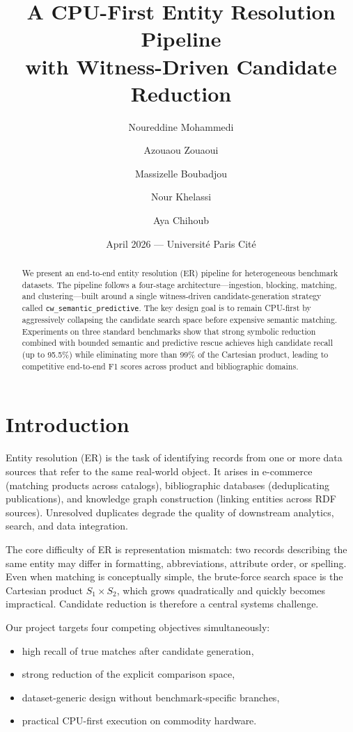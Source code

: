 \documentclass[10pt,twocolumn]{article}
\title{A CPU-First Entity Resolution Pipeline\\
       with Witness-Driven Candidate Reduction}
\author{
  Noureddine Mohammedi \and Azouaou Zouaoui \and
  Massizelle Boubadjou \and Nour Khelassi \and Aya Chihoub
}
\date{April 2026 --- Université Paris Cité}
\begin{document}
\maketitle

\begin{abstract}
We present an end-to-end entity resolution (ER) pipeline for heterogeneous
benchmark datasets. The pipeline follows a four-stage architecture---ingestion,
blocking, matching, and clustering---built around a single
witness-driven candidate-generation strategy called
\texttt{cw\_semantic\_predictive}. The key design goal is to remain CPU-first
by aggressively collapsing the candidate search space before expensive
semantic matching. Experiments on three standard benchmarks show that strong
symbolic reduction combined with bounded semantic and predictive rescue
achieves high candidate recall (up to 95.5\%) while eliminating more than
99\% of the Cartesian product, leading to competitive end-to-end F1 scores
across product and bibliographic domains.
\end{abstract}

\section{Introduction}
Entity resolution (ER) is the task of identifying records from one or more
data sources that refer to the same real-world object. It arises in
e-commerce (matching products across catalogs), bibliographic databases
(deduplicating publications), and knowledge graph construction (linking
entities across RDF sources). Unresolved duplicates degrade the quality of
downstream analytics, search, and data integration.

The core difficulty of ER is representation mismatch: two records describing
the same entity may differ in formatting, abbreviations, attribute order,
or spelling. Even when matching is conceptually simple, the brute-force
search space is the Cartesian product $S_1 \times S_2$, which grows
quadratically and quickly becomes impractical. Candidate reduction is
therefore a central systems challenge.

Our project targets four competing objectives simultaneously:
\begin{itemize}
  \item high recall of true matches after candidate generation,
  \item strong reduction of the explicit comparison space,
  \item dataset-generic design without benchmark-specific branches,
  \item practical CPU-first execution on commodity hardware.
\end{itemize}
\end{document}
